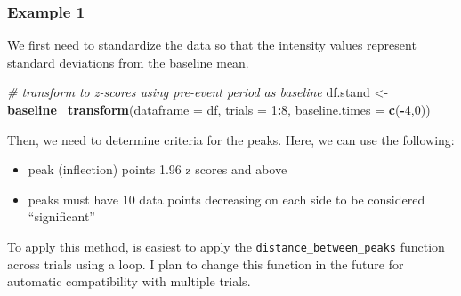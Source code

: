 \documentclass[
]{book}
\newenvironment{Shaded}{\begin{snugshade}}{\end{snugshade}}
\newcommand{\CommentTok}[1]{\textcolor[rgb]{0.56,0.35,0.01}{\textit{#1}}}
\newcommand{\DataTypeTok}[1]{\textcolor[rgb]{0.13,0.29,0.53}{#1}}
\newcommand{\DecValTok}[1]{\textcolor[rgb]{0.00,0.00,0.81}{#1}}
\newcommand{\KeywordTok}[1]{\textcolor[rgb]{0.13,0.29,0.53}{\textbf{#1}}}
\newcommand{\NormalTok}[1]{#1}
\newcommand{\OperatorTok}[1]{\textcolor[rgb]{0.81,0.36,0.00}{\textbf{#1}}}
\newcommand{\StringTok}[1]{\textcolor[rgb]{0.31,0.60,0.02}{#1}}
\providecommand{\tightlist}{%
  \setlength{\itemsep}{0pt}\setlength{\parskip}{0pt}}
\begin{document}
\hypertarget{analysis-app-numpeaks-ex1}{%
\subsubsection{Example 1}\label{analysis-app-numpeaks-ex1}}

We first need to standardize the data so that the intensity values represent standard deviations from the baseline mean.

\begin{Shaded}
\begin{Highlighting}[]
\CommentTok{# transform to z-scores using pre-event period as baseline}
\NormalTok{df.stand <-}\StringTok{ }\KeywordTok{baseline_transform}\NormalTok{(}\DataTypeTok{dataframe =}\NormalTok{ df, }\DataTypeTok{trials =} \DecValTok{1}\OperatorTok{:}\DecValTok{8}\NormalTok{,}
                               \DataTypeTok{baseline.times =} \KeywordTok{c}\NormalTok{(}\OperatorTok{-}\DecValTok{4}\NormalTok{,}\DecValTok{0}\NormalTok{)) }
\end{Highlighting}
\end{Shaded}

Then, we need to determine criteria for the peaks. Here, we can use the following:

\begin{itemize}
\tightlist
\item
  peak (inflection) points 1.96 z scores and above
\item
  peaks must have 10 data points decreasing on each side to be considered ``significant''
\end{itemize}

To apply this method, is easiest to apply the \texttt{distance\_between\_peaks} function across trials using a loop. I plan to change this function in the future for automatic compatibility with multiple trials.
\end{document}
